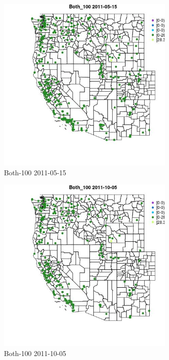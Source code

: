 \begin{figure} 
\centering  
\includegraphics[width=0.77\textwidth]{Code_Outputs/ML_input_report_ML_input_PM25_Step5_part_d_de_duplicated_aves_ML_input_MapObsBoth_1002011-05-15.jpg} 
\caption{\label{fig:ML_input_report_ML_input_PM25_Step5_part_d_de_duplicated_aves_ML_inputMapObsBoth_1002011-05-15}Both-100 2011-05-15} 
\end{figure} 
 

\begin{figure} 
\centering  
\includegraphics[width=0.77\textwidth]{Code_Outputs/ML_input_report_ML_input_PM25_Step5_part_d_de_duplicated_aves_ML_input_MapObsBoth_1002011-10-05.jpg} 
\caption{\label{fig:ML_input_report_ML_input_PM25_Step5_part_d_de_duplicated_aves_ML_inputMapObsBoth_1002011-10-05}Both-100 2011-10-05} 
\end{figure} 
 

